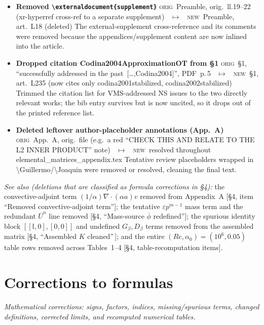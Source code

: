 \documentclass[11pt]{article}
\newcommand{\Orig}{\textcolor{origc}{\footnotesize\textsc{orig}}}
\newcommand{\New}{\textcolor{newc}{\footnotesize\textsc{new}}}
\newcommand{\code}[1]{\textcolor{newc}{\ttfamily\small #1}}
\newcommand{\pdfp}[1]{PDF~p.\,#1}
\newcommand{\artl}[1]{art.\ L#1}       %
\newcommand{\ch}[4]{%
  \item \textbf{#1}\newline
    {\footnotesize\Orig\ #2 \ \textcolor{locc}{$\longmapsto$} \ \New\ #3}\newline
    #4}
\begin{document}
\begin{itemize}
\ch{Removed \texttt{\textbackslash externaldocument\{supplement\}}}
   {Preamble, orig.\ ll.19--22 (xr-hyperref cross-ref to a separate supplement)}
   {Preamble, \artl{18} (deleted)}
   {The external-supplement cross-reference and its comments were removed because the
    appendices/supplement content are now inlined into the article.}
\ch{Dropped citation \code{Codina2004ApproximationOT} from \S1}
   {\S1, ``successfully addressed in the past~[\dots,Codina2004]'', \pdfp{5}}
   {\S1, \artl{235} (now cites only \code{codina2001stabilized}, \code{codina2002stabilized})}
   {Trimmed the citation list for VMS-addressed NS issues to the two directly relevant works; the bib
    entry survives but is now uncited, so it drops out of the printed reference list.}
\ch{Deleted leftover author-placeholder annotations (App.~A)}
   {App.~A, orig.\ file (e.g.\ a red ``CHECK THIS AND RELATE TO THE L2 INNER PRODUCT'' note)}
   {resolved throughout \code{elemental\_matrices\_appendix.tex}}
   {Tentative review placeholders wrapped in \code{\textbackslash Guillermo}/\code{\textbackslash Joaquin}
    were removed or resolved, cleaning the final text.}
\end{itemize}

\noindent\emph{See also (deletions that are classified as formula corrections in \S4):} the
convective-adjoint term $(1/\alpha)\nabla\!\cdot\!(\alpha a)v$ removed from Appendix~A [\S4, item
``Removed convective-adjoint term'']; the tentative $\varepsilon p^{m-1}$ mass term and the redundant
$\overline U^n$ line removed [\S4, ``Mass-source $\overline\phi$ redefined'']; the spurious identity
block $[[\mathbb I,0],[0,0]]$ and undefined $G_\beta,D_\beta$ terms removed from the assembled matrix
[\S4, ``Assembled $K$ cleaned''\,]; and the entire $(Re,\alpha_0){=}(10^6,0.05)$ table rows removed
across Tables~1--4 [\S4, table-recomputation items].

\section{Corrections to formulas}
\emph{Mathematical corrections: signs, factors, indices, missing/spurious terms, changed
definitions, corrected limits, and recomputed numerical tables.}
\end{document}
